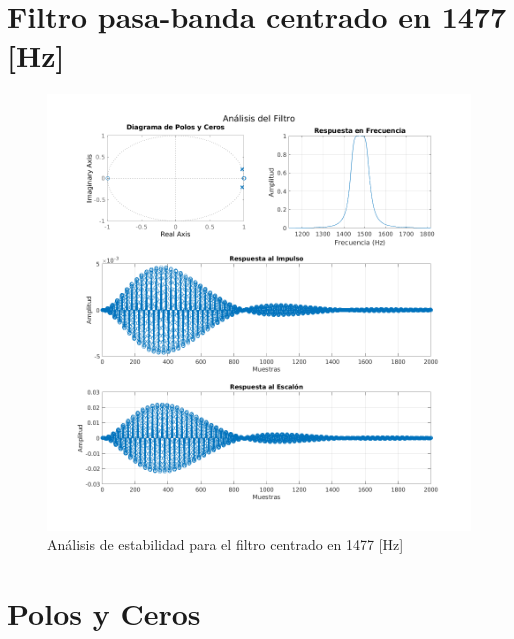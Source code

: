 \section{Filtro pasa-banda centrado en 1477 [Hz]}
\begin{figure}[H]
  \centering
  \includegraphics[width=\linewidth]{images/simulacion/1477.png}
  \caption{Análisis de estabilidad para el filtro centrado en 1477 [Hz]}
  \label{fig:analisis_1477}
\end{figure}

\pagebreak

\section{Polos y Ceros}
\label{sec:pz}
